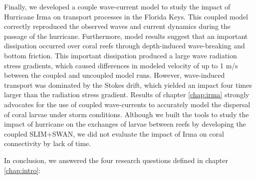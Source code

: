 Finally, we developed a couple wave-current model to study the impact of Hurricane Irma on transport processes in the Florida Keys. This coupled model correctly reproduced the observed waves and current dynamics during the passage of the hurricane. Furthermore, model results suggest that an important dissipation occurred over coral reefs through depth-induced wave-breaking and bottom friction. This important dissipation produced a large wave radiation stress gradients, which caused differences in modeled velocity of up to 1 m/s between the coupled and uncoupled model runs. However, wave-induced transport was dominated by the Stokes drift, which yielded an impact four times larger than the radiation stress gradient. Results of chapter \ref{chap:irma} strongly advocates for the use of coupled wave-currents to accurately model the dispersal of coral larvae under storm conditions. Although we built the tools to study the impact of hurricane on the exchanges of larvae between reefs by developing the coupled SLIM+SWAN, we did not evaluate the impact of Irma on coral connectivity by lack of time.

In conclusion, we answered the four research questions defined in chapter \ref{chap:intro}:

